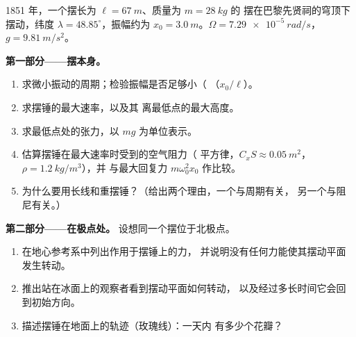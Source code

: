 \begin{problem}
\label{pb:b1:non-inertial-frames:1}
1851 年，一个摆长为 $\ell = \qty{67}{m}$、质量为 $m = \qty{28}{kg}$ 的
摆在巴黎先贤祠的穹顶下摆动，纬度 $\lambda =
48.85^\circ$，振幅约为 $x_0 = \qty{3.0}{m}$。$\Omega =
\qty{7.29e-5}{rad/s}$，$g = \qty{9.81}{m/s^2}$。

\medskip
\noindent\textbf{第一部分——摆本身。}
\begin{enumerate}
  \item 求微小振动的周期；检验振幅是否足够小（
        （$x_0/\ell$）。
  \item 求摆锤的最大速率，以及其
        离最低点的最大高度。
  \item 求最低点处的张力，以 $mg$ 为单位表示。
  \item 估算摆锤在最大速率时受到的空气阻力（
        平方律，$C_xS \approx \qty{0.05}{m^2}$，$\rho = \qty{1.2}{kg/m^3}$），并
        与最大回复力 $m\omega_0^2x_0$ 作比较。
  \item 为什么要用长线和重摆锤？（给出两个理由，一个与周期有关，
        另一个与阻尼有关。）
\end{enumerate}

\medskip
\noindent\textbf{第二部分——在极点处。}
设想同一个摆位于北极点。
\begin{enumerate}[resume]
  \item 在地心参考系中列出作用于摆锤上的力，
        并说明没有任何力能使其摆动平面发生转动。
  \item 推出站在冰面上的观察者看到摆动平面如何转动，
        以及经过多长时间它会回到初始方向。
  \item 描述摆锤在地面上的轨迹（玫瑰线）：一天内
        有多少个花瓣？
\end{enumerate}


\end{problem}
